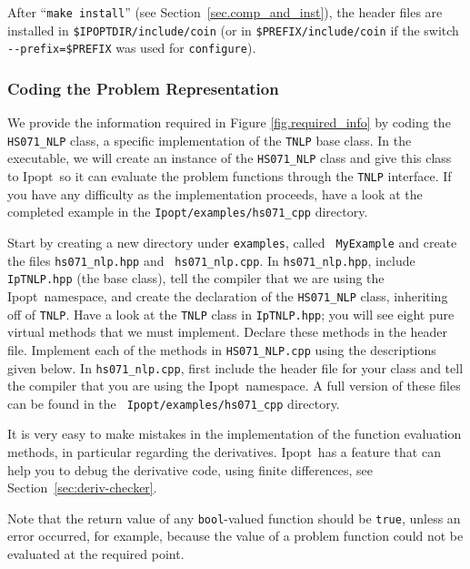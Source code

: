 \documentclass[10pt]{article}
\newcommand{\Ipopt}{{\sc Ipopt}}
\begin{document}
After ``\texttt{make install}'' (see Section~\ref{sec.comp_and_inst}),
the header files are installed in \texttt{\$IPOPTDIR/include/coin}
(or in \texttt{\$PREFIX/include/coin} if the switch
\verb|--prefix=$PREFIX| was used for {\tt configure}).

\subsubsection{Coding the Problem Representation}\label{sec.cpp_problem}
We provide the information required in Figure \ref{fig.required_info}
by coding the {\tt HS071\_NLP} class, a specific implementation of the
{\tt TNLP} base class. In the executable, we will create an instance
of the {\tt HS071\_NLP} class and give this class to \Ipopt\ so it can
evaluate the problem functions through the {\tt TNLP} interface. If
you have any difficulty as the implementation proceeds, have a look at
the completed example in the {\tt Ipopt/examples/hs071\_cpp} directory.

Start by creating a new directory under {\tt examples}, called {\tt
  MyExample} and create the files {\tt hs071\_nlp.hpp} and {\tt
  hs071\_nlp.cpp}. In {\tt hs071\_nlp.hpp}, include {\tt IpTNLP.hpp}
(the base class), tell the compiler that we are using the \Ipopt\
namespace, and create the declaration of the {\tt HS071\_NLP} class,
inheriting off of {\tt TNLP}. Have a look at the {\tt TNLP} class in
{\tt IpTNLP.hpp}; you will see eight pure virtual methods that we must
implement. Declare these methods in the header file.  Implement each
of the methods in {\tt HS071\_NLP.cpp} using the descriptions given
below. In {\tt hs071\_nlp.cpp}, first include the header file for your
class and tell the compiler that you are using the \Ipopt\ namespace.
A full version of these files can be found in the {\tt
  Ipopt/examples/hs071\_cpp} directory.

It is very easy to make mistakes in the implementation of the function
evaluation methods, in particular regarding the derivatives.  \Ipopt\
has a feature that can help you to debug the derivative code, using
finite differences, see Section~\ref{sec:deriv-checker}.

Note that the return value of any {\tt bool}-valued function should be
{\tt true}, unless an error occurred, for example, because the value of
a problem function could not be evaluated at the required point.
\end{document}
